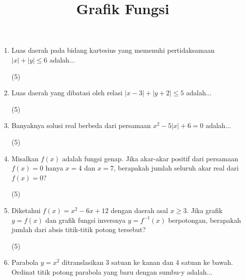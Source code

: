 \documentclass[12pt]{scrartcl}
\title{Grafik Fungsi}
\begin{document}
\renewcommand*\contentsname{Daftar Isi}
\tableofcontents

\newpage

    \begin{enumerate}
\item Luas daerah pada bidang kartesius yang memenuhi pertidaksamaan $|x| + |y| \le 6$ adalah...

\begin{tasks}[label=\Alph*](5)     

\end{tasks}

\item Luas daerah yang dibatasi oleh relasi $|x-3| + |y+2| \le 5$ adalah...

\begin{tasks}[label=\Alph*](5)     

\end{tasks}

\item Banyaknya solusi real berbeda dari persamaan $x^2 - 5|x| + 6 = 0$ adalah...

\begin{tasks}[label=\Alph*](5)     

\end{tasks}

\item Misalkan $f(x)$ adalah fungsi genap. Jika akar-akar positif dari persamaan $f(x)=0$ hanya $x=4$ dan $x=7$, berapakah jumlah seluruh akar real dari $f(x)=0$?

\begin{tasks}[label=\Alph*](5)     

\end{tasks}

\item Diketahui $f(x) = x^2 - 6x + 12$ dengan daerah asal $x \ge 3$. Jika grafik $y=f(x)$ dan grafik fungsi inversnya $y=f^{-1}(x)$ berpotongan, berapakah jumlah dari absis titik-titik potong tersebut?

\begin{tasks}[label=\Alph*](5)     

\end{tasks}

\item Parabola $y = x^2$ ditranslasikan 3 satuan ke kanan dan 4 satuan ke bawah. Ordinat titik potong parabola yang baru dengan sumbu-y adalah...


\end{enumerate}
\end{document}
